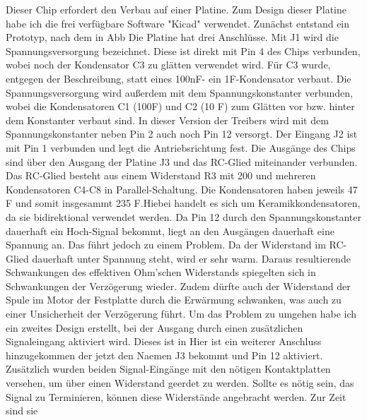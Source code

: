 Dieser Chip erfordert den Verbau auf einer Platine. Zum Design dieser Platine habe ich die frei verfügbare Software "Kicad" verwendet. %
Zunächst entstand ein Prototyp, nach dem in Abb %
Die Platine hat drei Anschlüsse. Mit J1 wird die Spannungsversorgung bezeichnet. Diese ist direkt mit Pin 4 des Chips verbunden, wobei noch der Kondensator C3 zu glätten verwendet wird. Für C3 wurde, entgegen der Beschreibung, statt eines 100nF- ein 1\mu F-Kondensator verbaut. Die Spannungsversorgung wird außerdem mit dem Spannungskonstanter verbunden, wobei die Kondensatoren C1 (100\mu F) und C2 (10 \mu F) zum Glätten vor bzw. hinter dem Konstanter verbaut sind. In dieser Version der Treibers wird mit dem Spannungskonstanter neben Pin 2 auch noch Pin 12 versorgt. Der Eingang J2 ist mit Pin 1 verbunden und legt die Antriebsrichtung fest. Die Ausgänge des Chips sind über den Ausgang der Platine J3 und das RC-Glied miteinander verbunden. Das RC-Glied besteht aus einem Widerstand R3 mit 200 \Ohm und mehreren Kondensatoren C4-C8 in Parallel-Schaltung. Die Kondensatoren haben jeweils 47 \mu F und somit insgesammt 235 \mu F.Hiebei handelt es sich um Keramikkondensatoren, da sie bidirektional verwendet werden.
Da Pin 12 durch den Spannungskonstanter dauerhaft ein Hoch-Signal bekommt, liegt an den Ausgängen dauerhaft eine Spannung an. Das führt jedoch zu einem Problem. Da der Widerstand im RC-Glied dauerhaft unter Spannung steht, wird er sehr warm. Daraus resultierende Schwankungen des effektiven Ohm'schen Widerstands spiegelten sich in Schwankungen der Verzögerung wieder. Zudem dürfte auch der Widerstand der Spule im Motor der Festplatte durch die Erwärmung schwanken, was auch zu einer Unsicherheit der Verzögerung führt. Um das Problem zu umgehen habe ich ein zweites Design erstellt, bei der Ausgang durch einen zusätzlichen Signaleingang aktiviert wird.
Dieses ist in %
Hier ist ein weiterer Anschluss hinzugekommen der jetzt den Naemen J3 bekommt und Pin 12 aktiviert. Zusätzlich wurden beiden Signal-Eingänge mit den nötigen Kontaktplatten versehen, um über einen Widerstand geerdet zu werden. Sollte es nötig sein, das Signal zu Terminieren, können diese Widerstände angebracht werden. Zur Zeit sind sie %
